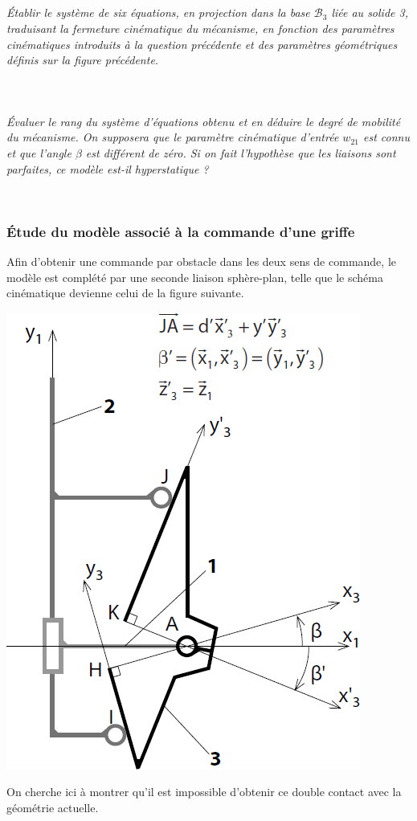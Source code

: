 \documentclass[10pt,fleqn]{article} %
\begin{document}
\begin{multicols}{2}
\subparagraph{}\textit{Établir le système de six équations, en projection dans la base $\mathcal{B}_{3}$ liée au solide 3, traduisant la fermeture cinématique du mécanisme, en fonction des paramètres cinématiques introduits à la question précédente et des paramètres géométriques définis sur la figure précédente.}
\ifprof
\begin{corrige}~\\
\end{corrige}
\else
\fi


\subparagraph{}\textit{Évaluer le rang du système d'équations obtenu et en déduire le degré de mobilité du mécanisme. On supposera
que le paramètre cinématique d'entrée $w_{21}$ est connu et que l'angle $\beta$ est différent de zéro.
Si on fait l'hypothèse que les liaisons sont parfaites, ce modèle est-il hyperstatique ?}
\ifprof
\begin{corrige}~\\
\end{corrige}
\else
\fi

\subsubsection*{Étude du modèle associé à la commande d'une griffe}
Afin d'obtenir une commande par obstacle dans les deux sens de commande, le modèle est complété par une
seconde liaison sphère-plan, telle que le schéma cinématique devienne celui de la figure suivante.

\begin{center}
\includegraphics[width=.8\linewidth]{images/fig_02}
\end{center}
\begin{obj}
On cherche ici à montrer qu'il est impossible d'obtenir ce double contact avec la géométrie actuelle.
\end{obj}




\end{multicols}
\end{document}
